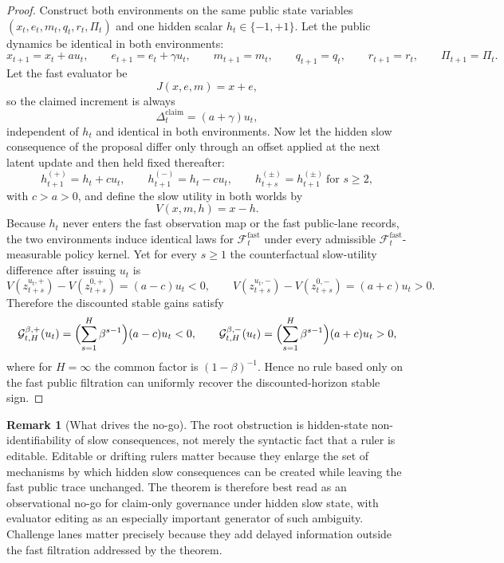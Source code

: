 \documentclass[11pt]{article}
\theoremstyle{definition}
\newtheorem{remark}[theorem]{Remark}
\newcommand{\1}{\mathbf{1}}
\begin{document}
\begin{proof}
Construct both environments on the same public state variables $(x_t,e_t,m_t,q_t,r_t,\Pi_t)$ and one hidden scalar $h_t\in\{-1,+1\}$. Let the public dynamics be identical in both environments:
\[
x_{t+1}=x_t+a u_t,
\qquad
e_{t+1}=e_t+\gamma u_t,
\qquad
m_{t+1}=m_t,
\qquad
q_{t+1}=q_t,
\qquad
r_{t+1}=r_t,
\qquad
\Pi_{t+1}=\Pi_t.
\]
Let the fast evaluator be
\[
J(x,e,m)=x+e,
\]
so the claimed increment is always
\[
\Delta_t^{\mathrm{claim}}=(a+\gamma)u_t,
\]
independent of $h_t$ and identical in both environments. Now let the hidden slow consequence of the proposal differ only through an offset applied at the next latent update and then held fixed thereafter:
\[
h_{t+1}^{(+)}=h_t + c u_t,
\qquad
h_{t+1}^{(-)}=h_t - c u_t,
\qquad
h_{t+s}^{(\pm)}=h_{t+1}^{(\pm)}\ \text{for } s\ge 2,
\]
with $c>a>0$, and define the slow utility in both worlds by
\[
V(x,m,h)=x-h.
\]
Because $h_t$ never enters the fast observation map or the fast public-lane records, the two environments induce identical laws for $\mathcal F_t^{\mathrm{fast}}$ under every admissible $\mathcal F_t^{\mathrm{fast}}$-measurable policy kernel. Yet for every $s\ge 1$ the counterfactual slow-utility difference after issuing $u_t$ is
\[
V(z_{t+s}^{u_t,+})-V(z_{t+s}^{0,+})=(a-c)u_t<0,
\qquad
V(z_{t+s}^{u_t,-})-V(z_{t+s}^{0,-})=(a+c)u_t>0.
\]
Therefore the discounted stable gains satisfy
\[
\mathcal G_{t,H}^{\beta,+}(u_t)=\Bigl(\sum_{s=1}^{H}\beta^{s-1}\Bigr)(a-c)u_t<0,
\qquad
\mathcal G_{t,H}^{\beta,-}(u_t)=\Bigl(\sum_{s=1}^{H}\beta^{s-1}\Bigr)(a+c)u_t>0,
\]
where for $H=\infty$ the common factor is $(1-\beta)^{-1}$. Hence no rule based only on the fast public filtration can uniformly recover the discounted-horizon stable sign.
\end{proof}

\begin{remark}[What drives the no-go]
The root obstruction is hidden-state non-identifiability of slow consequences, not merely the syntactic fact that a ruler is editable. Editable or drifting rulers matter because they enlarge the set of mechanisms by which hidden slow consequences can be created while leaving the fast public trace unchanged. The theorem is therefore best read as an observational no-go for claim-only governance under hidden slow state, with evaluator editing as an especially important generator of such ambiguity. Challenge lanes matter precisely because they add delayed information outside the fast filtration addressed by the theorem.
\end{remark}
\end{document}

